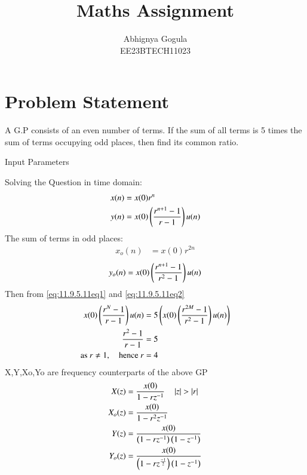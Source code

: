\documentclass[journal,12pt,twocolumn]{IEEEtran}
\theoremstyle{remark}
\begin{document}

\title{Maths Assignment}
\author{Abhignya Gogula\\
        EE23BTECH11023}
\maketitle
\section*{Problem Statement}
A G.P consists of an even number of terms. If the sum of all terms is 5 times the sum of terms occupying odd places, then find its common ratio.
\Solution
\fi
\begin{table}[h!]
\centering

\caption{Input Parameters}
\label{11.9.5.11tab1}
\end{table}
Solving the Question in time domain:
\begin{align}
x(n) &= x(0)r^{n} \\
y(n) &= x(0)\left(\frac{r^{n+1}-1}{r-1}\right)u(n)
\label{eq:11.9.5.11eq1}
\end{align}
The sum of terms in odd places:
\begin{align}
x_o(n) &= x(0)r^{2n}
\end{align}
\begin{equation}
y_o(n)= x(0)\left(\frac{r^{n+1}-1}{r^2-1}\right)u(n)
\label{eq:11.9.5.11eq2}
\end{equation}
Then from \eqref{eq:11.9.5.11eq1} and \eqref{eq:11.9.5.11eq2}
\begin{align}
x(0)\left(\frac{r^{N}-1}{r-1}\right)u(n) &= 5\left(x(0)\left(\frac{r^{2M}-1}{r^2-1}\right)u(n)\right)\\
\frac{r^2-1}{r-1} &= 5\\
\text{as } r \neq 1, \quad \text{hence } r &= 4\\
\end{align}
X,Y,Xo,Yo are frequency counterparts of the above GP
\begin{align}
X(z) &= \frac{x(0)}{1-rz^{-1}} \quad \left\vert z\right\vert > \left\vert r\right\vert\\ 
X_o(z) &= \frac{x(0)}{1-r^{2}z^{-1}}\\
Y(z) &= \frac{x(0)}{\left(1-rz^{-1}\right)\left(1-z^{-1}\right)}\\
Y_o(z) &= \frac{x(0)}{\left(1-rz^{\frac{-1}{2}}\right)\left(1-z^{-1}\right)}
\end{align}
\end{document}
